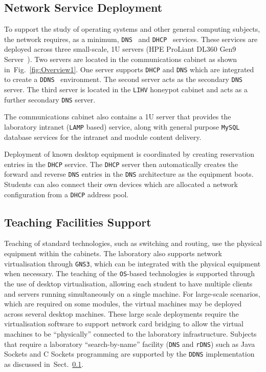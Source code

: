 \documentclass[10pt,journal]{IEEEtran}
\begin{document}
\subsection{Network Service Deployment}\label{InfraService}

To support the study of operating systems and other general computing subjects,
the network requires, as a minimum, \texttt{DNS}~\cite{RA:11} and
\texttt{DHCP}~\cite{DL:02} services. These services are deployed across three
small-scale, 1U servers (HPE ProLiant DL360 Gen9 Server~\cite{HPE:17}). Two
servers are located in the communications cabinet as shown
in~Fig.~\ref{fig:Overview1}. One server supports \texttt{DHCP} and \texttt{DNS}
which are integrated to create a \texttt{DDNS}~\cite{SV:06} environment. The
second server acts as the secondary \texttt{DNS} server. The third server is
located in the \texttt{LIHV} honeypot cabinet and acts as a further secondary
\texttt{DNS} server.

The communications cabinet also contains a 1U server that provides the
laboratory intranet (\texttt{LAMP} based) service, along with general purpose
\texttt{MySQL} database services for the intranet and module content delivery.

Deployment of known desktop equipment is coordinated by creating reservation
entries in the \texttt{DHCP} service. The \texttt{DHCP} server then
automatically creates the forward and reverse \texttt{DNS} entries in the
\texttt{DNS} architecture as the equipment boots. Students can also connect
their own devices which are allocated a network configuration from a
\texttt{DHCP} address pool.

\subsection{Teaching Facilities Support}

Teaching of standard technologies, such as switching and routing, use the
physical equipment within the cabinets. The laboratory also supports network
virtualisation through \texttt{GNS3}, which can be integrated with the physical
equipment when necessary. The teaching of the \texttt{OS}-based technologies is
supported through the use of desktop virtualisation, allowing each student to
have multiple clients and servers running simultaneously on a single machine.
For large-scale scenarios, which are required on some modules, the virtual
machines may be deployed across several desktop machines. These large scale
deployments require the virtualisation software to support network card
bridging to allow the virtual machines to be ``physically'' connected to the
laboratory infrastructure.  Subjects that require a laboratory
``search-by-name'' facility (\texttt{DNS} and \texttt{rDNS}) such as Java
Sockets and C Sockets programming are supported by the \texttt{DDNS}
implementation as discussed in~Sect.~\ref{InfraService}.
\end{document}
